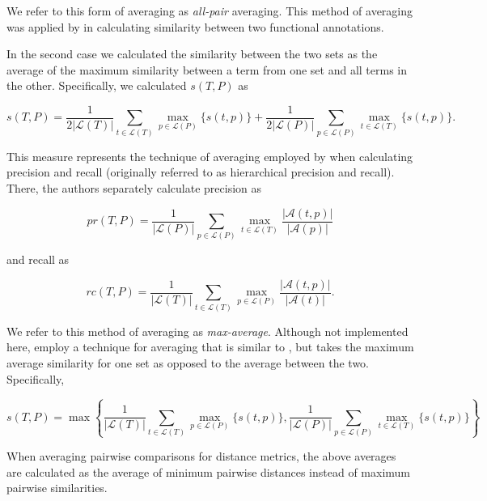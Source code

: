 \noindent We refer to this form of averaging as \emph{all-pair} averaging. This method of averaging was applied by \citet{Lord2003} in calculating similarity between two functional annotations.

In the second case we calculated the similarity between the two sets as the average of the maximum similarity between a term from one set and all terms in the other.  Specifically, we calculated $s(T,P)$ as 

\begin{equation}
s(T, P)=\frac{1}{2|\mathcal{L}(T)|}\underset{t\in\mathcal{L}(T)}{\sum}\underset{p\in\mathcal{L}(P)}{\max}\{s(t,p)\}+\frac{1}{2|\mathcal{L}(P)|}\underset{p\in\mathcal{L}(P)}{\sum}\underset{t\in\mathcal{L}(T)}{\max}\{s(t, p)\}.
\label{eq:maxaverage}
\end{equation}

\noindent This measure represents the technique of averaging employed by \citet{Verspoor2006} when calculating precision and recall (originally referred to as hierarchical precision and recall). There, the authors separately calculate precision as

\begin{equation}
pr(T, P)=\frac{1}{|\mathcal{L}(P)|}\underset{p\in\mathcal{L}(P)}{\sum}\underset{t\in\mathcal{L}(T)}{\max}\frac{|\mathcal{A}(t,p)|}{|\mathcal{A}(p)|}
\end{equation}

\noindent and recall as

\begin{equation}
rc(T, P)=\frac{1}{|\mathcal{L}(T)|}\underset{t\in\mathcal{L}(T)}{\sum}\underset{p\in\mathcal{L}(P)}{\max}\frac{|\mathcal{A}(t,p)|}{|\mathcal{A}(t)|}.
\end{equation}

\noindent We refer to this method of averaging as \emph{max-average}. Although not implemented here, \citet{Schlicker2006} employ a technique for averaging that is similar to , but takes the maximum average similarity for one set as opposed to the average between the two. Specifically,

\begin{equation}
s(T, P)=\max \left\{ \frac{1}{|\mathcal{L}(T)|}\underset{t\in\mathcal{L}(T)}{\sum}\underset{p\in\mathcal{L}(P)}{\max}\{s(t,p)\},\frac{1}{|\mathcal{L}(P)|}\underset{p\in\mathcal{L}(P)}{\sum}\underset{t\in\mathcal{L}(T)}{\max}\{s(t,p)\} \right\} 
\end{equation}

\noindent When averaging pairwise comparisons for distance metrics, the above averages are calculated as the average of minimum pairwise distances instead of maximum pairwise similarities.  

